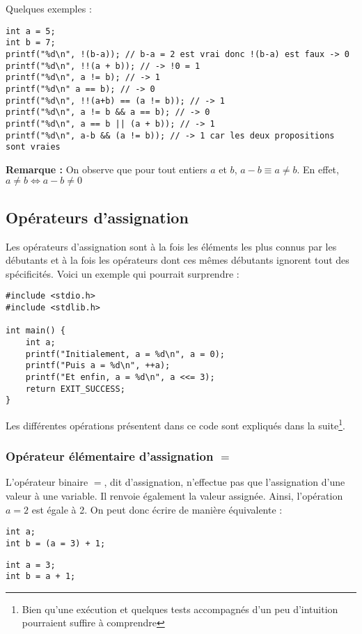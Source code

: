 \documentclass[../../../main.tex]{subfiles}
\begin{document}
Quelques exemples :
\begin{verbatim}
int a = 5;
int b = 7;
printf("%d\n", !(b-a)); // b-a = 2 est vrai donc !(b-a) est faux -> 0
printf("%d\n", !!(a + b)); // -> !0 = 1
printf("%d\n", a != b); // -> 1
printf("%d\n" a == b); // -> 0
printf("%d\n", !!(a+b) == (a != b)); // -> 1
printf("%d\n", a != b && a == b); // -> 0
printf("%d\n", a == b || (a + b)); // -> 1
printf("%d\n", a-b && (a != b)); // -> 1 car les deux propositions sont vraies
\end{verbatim}
\textbf{Remarque :} On observe que pour tout entiers $a$ et $b$, $a-b\equiv a \neq b$. En effet, $a \neq b \Leftrightarrow a - b \neq{0}$
\subsection{Opérateurs d'assignation}
Les opérateurs d'assignation sont à la fois les éléments les plus connus par les débutants et à la fois les opérateurs dont ces mêmes débutants ignorent tout des spécificités. Voici un exemple qui pourrait surprendre :
\begin{verbatim}
#include <stdio.h>
#include <stdlib.h>

int main() {
	int a;
	printf("Initialement, a = %d\n", a = 0);
	printf("Puis a = %d\n", ++a);
	printf("Et enfin, a = %d\n", a <<= 3);
	return EXIT_SUCCESS;
}
\end{verbatim}
Les différentes opérations présentent dans ce code sont expliqués dans la suite\footnote{Bien qu'une exécution et quelques tests accompagnés d'un peu d'intuition pourraient suffire à comprendre}.
 
\subsubsection{Opérateur élémentaire d'assignation $=$}
 
L'opérateur binaire $=$, dit d'assignation, n'effectue pas que l'assignation d'une valeur à une variable. Il renvoie également la valeur assignée.\newline
Ainsi, l'opération $a = 2$ est égale à 2. On peut donc écrire de manière équivalente :

\begin{minipage}{0.5\textwidth}
\begin{verbatim}
int a;
int b = (a = 3) + 1;
\end{verbatim}
\end{minipage}
\begin{minipage}{0.5\textwidth}
\begin{verbatim}
int a = 3;
int b = a + 1;
\end{verbatim}
\end{minipage}
\end{document}
